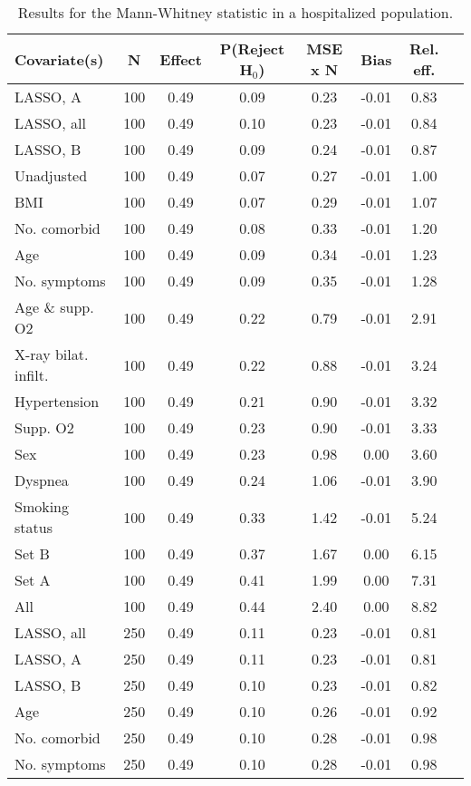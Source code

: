 \documentclass{article}
\begin{document}
{\tabcolsep=6pt  %
\begin{longtable}{lccccccc}
\caption{Results for the Mann-Whitney statistic in a hospitalized population.}\label{tab17}\\
Covariate(s) & N & Effect & P(Reject H$_0$) & MSE x N & Bias & Rel. eff.\\ \midrule
LASSO, A & 100 & 0.49 & 0.09 & 0.23 & -0.01 & 0.83\\
LASSO, all & 100 & 0.49 & 0.10 & 0.23 & -0.01 & 0.84\\
LASSO, B & 100 & 0.49 & 0.09 & 0.24 & -0.01 & 0.87\\
Unadjusted & 100 & 0.49 & 0.07 & 0.27 & -0.01 & 1.00\\
BMI & 100 & 0.49 & 0.07 & 0.29 & -0.01 & 1.07\\
No. comorbid & 100 & 0.49 & 0.08 & 0.33 & -0.01 & 1.20\\
Age & 100 & 0.49 & 0.09 & 0.34 & -0.01 & 1.23\\
No. symptoms & 100 & 0.49 & 0.09 & 0.35 & -0.01 & 1.28\\
Age \& supp. O2 & 100 & 0.49 & 0.22 & 0.79 & -0.01 & 2.91\\
X-ray bilat. infilt. & 100 & 0.49 & 0.22 & 0.88 & -0.01 & 3.24\\
Hypertension & 100 & 0.49 & 0.21 & 0.90 & -0.01 & 3.32\\
Supp. O2 & 100 & 0.49 & 0.23 & 0.90 & -0.01 & 3.33\\
Sex & 100 & 0.49 & 0.23 & 0.98 & 0.00 & 3.60\\
Dyspnea & 100 & 0.49 & 0.24 & 1.06 & -0.01 & 3.90\\
Smoking status & 100 & 0.49 & 0.33 & 1.42 & -0.01 & 5.24\\
Set B & 100 & 0.49 & 0.37 & 1.67 & 0.00 & 6.15\\
Set A & 100 & 0.49 & 0.41 & 1.99 & 0.00 & 7.31\\
All & 100 & 0.49 & 0.44 & 2.40 & 0.00 & 8.82\\ \midrule
LASSO, all & 250 & 0.49 & 0.11 & 0.23 & -0.01 & 0.81\\
LASSO, A & 250 & 0.49 & 0.11 & 0.23 & -0.01 & 0.81\\
LASSO, B & 250 & 0.49 & 0.10 & 0.23 & -0.01 & 0.82\\
Age & 250 & 0.49 & 0.10 & 0.26 & -0.01 & 0.92\\
No. comorbid & 250 & 0.49 & 0.10 & 0.28 & -0.01 & 0.98\\
No. symptoms & 250 & 0.49 & 0.10 & 0.28 & -0.01 & 0.98\\

\end{longtable}}
\end{document}
